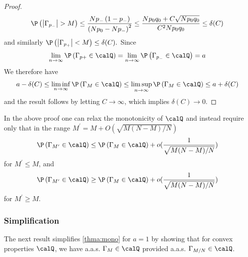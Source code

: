 \documentclass{article}
\begin{document}
\begin{proof}
\begin{align*}
\P \left(\left|\Gamma_{p_{-}}\right|>M\right) \leq \frac{N p_{-}\left(1-p_{-}\right)}{\left(N p_{0}-N p_{-}\right)^{2}} \leq \frac{N p_{0} q_{0}+C \sqrt{N p_{0} q_{0}}}{C^{2} N p_{0} q_{0}} \leq \delta(C)
\end{align*}
and similarly $\P \left(\left|\Gamma_{p_{+}}\right|<M\right) \leq \delta(C) .$ Since
\begin{align*}
\lim _{n \rightarrow \infty} \P \left(\Gamma_{p+} \in \calQ \right)=\lim _{n \rightarrow \infty} \P \left(\Gamma_{p_{-}} \in \calQ \right)=a
\end{align*}
We therefore have
\begin{align*}
a-\delta(C) \leq \liminf _{n \rightarrow \infty} \P \left(\Gamma_{M} \in \calQ \right) \leq \limsup _{n \rightarrow \infty} \P \left(\Gamma_{M} \in \calQ \right) \leq a+\delta(C)
\end{align*}
and the result follows by letting $C \rightarrow \infty$, which implies $\delta(C) \rightarrow 0$.
\end{proof}
\begin{rema}
In the above proof one can relax the monotonicity of $\calQ$ and instead require only that in the range $M^{\prime}=M+O(\sqrt{M(N-M) / N})$
\begin{align*}
\P \left(\Gamma_{M^{\prime}} \in \calQ \right) \leq \P \left(\Gamma_{M} \in \calQ \right)+o(\frac{1}{\sqrt{M(N-M) / N}})
\end{align*}
for $M^{\prime} \leq M$, and
\begin{align*}
\P \left(\Gamma_{M^{\prime} } \in \calQ \right) \geq \P \left(\Gamma_{M} \in \calQ \right)+o(\frac{1}{\sqrt{M(N-M) / N}})
\end{align*}
for $M^{\prime} \geq M .$ 
\end{rema} 

\subsubsection{Simplification}

The next result simplifies \cref{thma:mono} for $a=1$ by showing that for convex properties $\calQ$, we have a.a.s. $\Gamma_{M} \in \calQ$ provided a.a.s. $\Gamma_{M / N} \in \calQ$.
\end{document}
